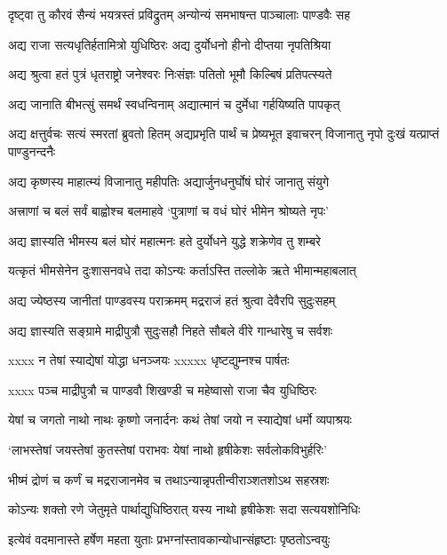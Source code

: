 \twolineshloka
{दृष्ट्वा तु कौरवं सैन्यं भयत्रस्तं प्रविद्रुतम्}
{अन्योन्यं समभाषन्त पाञ्चालाः पाण्डवैः सह}


\twolineshloka
{अद्य राजा सत्यधृतिर्हतामित्रो युधिष्ठिरः}
{अद्य दुर्योधनो हीनो दीप्तया नृपतिश्रिया}


\twolineshloka
{अद्य श्रुत्वा हतं पुत्रं धृतराष्ट्रो जनेश्वरः}
{निःसंज्ञः पतितो भूमौ किल्बिषं प्रतिपत्स्यते}


\twolineshloka
{अद्य जानाति बीभत्सुं समर्थं स्वधन्विनाम्}
{अद्यात्मानं च दुर्मेधा गर्हयिष्यति पापकृत्}


\threelineshloka
{अद्य क्षत्तुर्वचः सत्यं स्मरतां ब्रुवतो हितम्}
{अद्यप्रभृति पार्थं च प्रेष्यभूत इवाचरन्}
{विजानातु नृपो दुःखं यत्प्राप्तं पाण्डुनन्दनैः}


\twolineshloka
{अद्य कृष्णस्य माहात्म्यं विजानातु महीपतिः}
{अद्यार्जुनधनुर्घोषं घोरं जानातु संयुगे}


\twolineshloka
{अत्त्राणां च बलं सर्वं बाह्वोश्च बलमाहवे}
{`पुत्राणां च वधं घोरं भीमेन श्रोष्यते नृपः'}


\twolineshloka
{अद्य ज्ञास्यति भीमस्य बलं घोरं महात्मनः}
{हते दुर्योधने युद्धे शक्रेणेव तु शम्बरे}


\threelineshloka
{यत्कृतं भीमसेनेन दुःशासनवधे तदा}
{कोऽन्यः कर्ताऽस्ति तल्लोके ऋते भीमान्महाबलात्}
{}


\twolineshloka
{अद्य ज्येष्ठस्य जानीतां पाण्डवस्य पराक्रमम्}
{मद्रराजं हतं श्रुत्वा देवैरपि सुदुःसहम्}


\twolineshloka
{अद्य ज्ञास्यति सङ्ग्रामे माद्रीपुत्रौ सुदुःसहौ}
{निहते सौबले वीरे गान्धारेषु च सर्वशः}


\twolineshloka
{xxxx न तेषां स्याद्येषां योद्धा धनञ्जयः}
{xxxxx धृष्टद्युम्नश्च पार्षतः}


\twolineshloka
{xxxx पञ्च माद्रीपुत्रौ च पाण्डवौ}
{शिखण्डी च महेष्वासो राजा चैव युधिष्ठिरः}


\twolineshloka
{येषां च जगतो नाथो नाथः कृष्णो जनार्दनः}
{कथं तेषां जयो न स्याद्येषां धर्मो व्यपाश्रयः}


\twolineshloka
{`लाभस्तेषां जयस्तेषां कुतस्तेषां पराभवः}
{येषां नाथो हृषीकेशः सर्वलोकविभुर्हरिः'}


\twolineshloka
{भीष्मं द्रोणं च कर्णं च मद्रराजानमेव च}
{तथाऽन्यान्नृपतीन्वीराञ्शतशोऽथ सहस्रशः}


\twolineshloka
{कोऽन्यः शक्तो रणे जेतुमृते पार्थाद्युधिष्ठिरात्}
{यस्य नाथो हृषीकेशः सदा सत्ययशोनिधिः}


\twolineshloka
{इत्येवं वदमानास्ते हर्षेण महता युताः}
{प्रभग्नांस्तावकान्योधान्संहृष्टाः पृष्ठतोऽन्वयुः}


